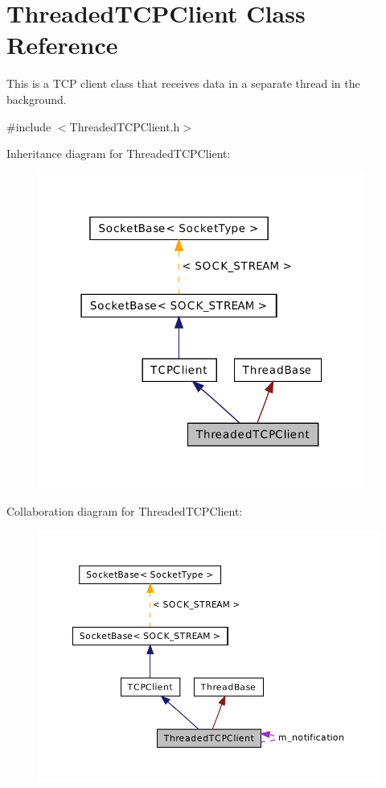 \hypertarget{class_threaded_t_c_p_client}{\section{Threaded\-T\-C\-P\-Client Class Reference}
\label{class_threaded_t_c_p_client}
}


This is a T\-C\-P client class that receives data in a separate thread in the background.  




{\ttfamily \#include $<$Threaded\-T\-C\-P\-Client.\-h$>$}



Inheritance diagram for Threaded\-T\-C\-P\-Client\-:\nopagebreak
\begin{figure}[H]
\begin{center}
\leavevmode
\includegraphics[width=303pt]{class_threaded_t_c_p_client__inherit__graph}
\end{center}
\end{figure}


Collaboration diagram for Threaded\-T\-C\-P\-Client\-:\nopagebreak
\begin{figure}[H]
\begin{center}
\leavevmode
\includegraphics[width=350pt]{class_threaded_t_c_p_client__coll__graph}
\end{center}
\end{figure}

